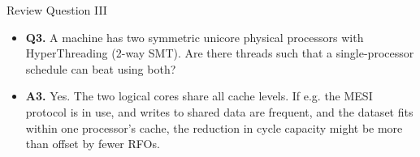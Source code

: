 \documentclass[handout]{beamer}
\begin{document}
\begin{frame}{Review Question III}
\begin{itemize}
\item \textbf{Q3.} A machine has two symmetric unicore physical processors with HyperThreading
	(2-way SMT). Are there threads such that a single-processor
	schedule can beat using both?
\item \textbf{A3.} Yes. The two logical cores share all cache levels. If e.g.
	the MESI protocol is in use, and writes to shared data are frequent,
	and the dataset fits within one processor's cache, the reduction in
	cycle capacity might be more than offset by fewer RFOs. 
\end{itemize}
\end{frame}
\end{document}
